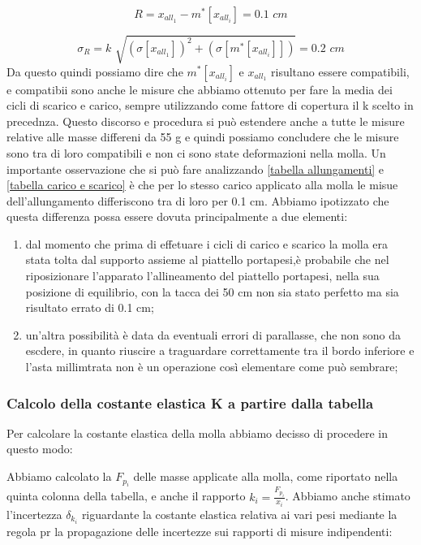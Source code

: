 \begin{equation*}
	R = x_{all_1} - m^*[x_{all_i}] = 0.1 \,\,cm
\end{equation*}

\begin{equation*}
	\sigma_{R} = k\,\, \sqrt{(\sigma[x_{all_1}])^2 + (\sigma[m^*[x_{all_i}]])} = 0.2 \,\,cm
\end{equation*}
Da questo quindi possiamo dire che $m^*[x_{all_i}]$ e $x_{all_1}$ risultano essere compatibili, e compatibii sono anche le misure che abbiamo ottenuto per fare la media dei cicli di scarico e carico, sempre utilizzando come fattore di copertura il k scelto in precednza.
Questo discorso e procedura si può estendere anche a tutte le misure relative alle masse differeni da 55 g e quindi possiamo concludere che le misure sono tra di loro compatibili e non ci sono state deformazioni nella molla.
Un importante osservazione che si può fare analizzando \ref{tabella allungamenti} e \ref{tabella carico e scarico} è che per lo stesso carico applicato alla molla le misue dell'allungamento differiscono tra di loro per 0.1 cm. Abbiamo ipotizzato che questa differenza possa essere dovuta principalmente a due elementi:

\begin{enumerate}
	\item{dal momento che prima di effetuare i cicli di carico e scarico la molla era stata tolta dal supporto assieme al piattello portapesi,è probabile che nel riposizionare l'apparato l'allineamento del piattello portapesi, nella sua posizione di equilibrio, con la tacca dei 50 cm non sia stato perfetto ma sia risultato errato di 0.1 cm;}
	\item{un'altra possibilità è data da eventuali errori di parallasse, che non sono da escdere, in quanto riuscire a traguardare correttamente tra il bordo inferiore e l'asta millimtrata non è un operazione così elementare come può sembrare;}
\end{enumerate}

\subsubsection{Calcolo della costante elastica K a partire dalla tabella}
Per calcolare la costante elastica della molla abbiamo decisso di procedere in questo modo:

Abbiamo calcolato la $F_{p_{i}}$ delle masse applicate alla molla, come riportato nella quinta colonna della tabella, e anche il rapporto $k_{i} = \frac{F_{p_{i}}}{x_{i}}$. Abbiamo anche stimato l'incertezza $\delta_{k_{i}}$ riguardante la costante elastica relativa ai vari pesi mediante la regola pr la propagazione delle incertezze sui rapporti di misure indipendenti:

